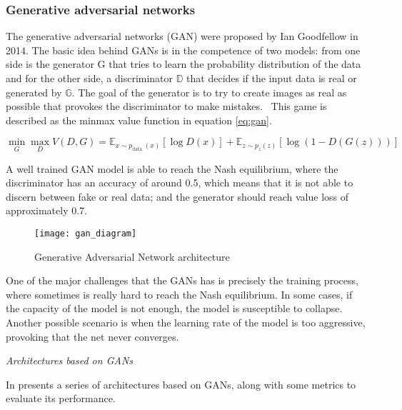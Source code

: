 \subsubsection{Generative adversarial networks}

The generative adversarial networks (GAN) were proposed by Ian Goodfellow \cite{Goodfellow2014} in 2014. The basic idea behind GANs is in the competence of two models: from one side is the generator G that tries to learn the probability distribution of the data and for the other side, a discriminator \begin{math}\mathbb{D}\end{math} that decides if the input data is real or generated by \begin{math}\mathbb{G}\end{math}. The goal of the generator is to try to create images as real as possible that provokes the discriminator to make mistakes.  This game is described as the minmax value function in equation \ref{eq:gan}.

\begin{equation}
 \min _{G} \max _{D} V(D, G)=\mathbb{E}_{x \sim p_{\text {data }}(x)}[\log D(x)]+\mathbb{E}_{z \sim p_{z}(z)}[\log (1-D(G(z)))]
 \label{eq:gan}
\end{equation}

A well trained GAN model is able to reach the Nash equilibrium, where the discriminator has an accuracy of around 0.5, which means that it is not able to discern between fake or real data; and the generator should reach value loss of approximately 0.7.

\begin{figure}[htb]
  \centering
  \texttt{[image: gan\_diagram]}
  \caption[Generative Adversarial Network architecture]{Generative Adversarial Network architecture}
  \label{fig:gan}
\end{figure}

One of the major challenges that the GANs has is precisely the training process, where sometimes is really hard to reach the Nash equilibrium. In some cases, if the capacity of the model is not enough, the model is susceptible to collapse. Another possible scenario is when the learning rate of the model is too aggressive, provoking that the net never converges.

\textit{Architectures based on GANs}

In \cite{Pan2019} presents a series of architectures based on GANs, along with some metrics to evaluate its performance.

